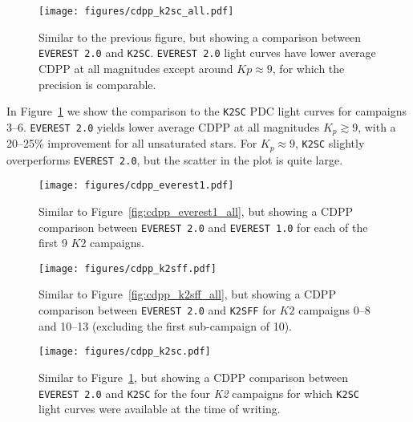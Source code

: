 \documentclass[]{emulateapj}
\newcommand{\Kp}{\ensuremath{Kp}}
\newcommand{\edited}[1]{{\color{red} #1}}
\begin{document}
\begin{figure}[hbt]
  \begin{center}
      \texttt{[image: figures/cdpp\_k2sc\_all.pdf]}
       \caption{Similar to the previous figure, but showing a comparison between \texttt{EVEREST 2.0} and \texttt{K2SC}.
       \texttt{EVEREST 2.0} light curves have lower average CDPP at all magnitudes except around $\Kp \approx 9$, for which
       the precision is comparable.}
     \label{fig:cdpp_k2sc_all}
  \end{center}
\end{figure}

In Figure~\ref{fig:cdpp_k2sc_all} we show the comparison to the \texttt{K2SC} PDC
light curves \citep{Aigrain15,Aigrain16} \edited{for campaigns 3--6}. \texttt{EVEREST 2.0} yields lower average CDPP at all
magnitudes $K_p \gtrsim 9$, with a 20--25\% improvement for
all unsaturated stars. For $K_p \approx 9$, \texttt{K2SC} slightly overperforms
\texttt{EVEREST 2.0}, but the scatter in the plot is quite large.

\begin{figure}[hbt]
  \begin{center}
      \texttt{[image: figures/cdpp\_everest1.pdf]}
       \caption{Similar to Figure~\ref{fig:cdpp_everest1_all}, but showing a CDPP comparison between
       \texttt{EVEREST 2.0} and \texttt{EVEREST 1.0} for each of the first 9 $K2$ campaigns.}
     \label{fig:cdpp_everest1}
  \end{center}
\end{figure}

\begin{figure}[hbt]
  \begin{center}
      \texttt{[image: figures/cdpp\_k2sff.pdf]}
       \caption{\edited{Similar to Figure~\ref{fig:cdpp_k2sff_all}, but showing a CDPP comparison between
       \texttt{EVEREST 2.0} and \texttt{K2SFF} for $K2$ campaigns 0--8 and 10--13 (excluding the first sub-campaign
       of 10).}}
     \label{fig:cdpp_k2sff}
  \end{center}
\end{figure}

\begin{figure}[hbt]
  \begin{center}
      \texttt{[image: figures/cdpp\_k2sc.pdf]}
       \caption{Similar to Figure~\ref{fig:cdpp_k2sc_all}, but showing a CDPP comparison between
       \texttt{EVEREST 2.0} and \texttt{K2SC} for \edited{the four \emph{K2} campaigns for which
       \texttt{K2SC} light curves were available at the time of writing.}}
     \label{fig:cdpp_k2sc}
  \end{center}
\end{figure}
\end{document}
